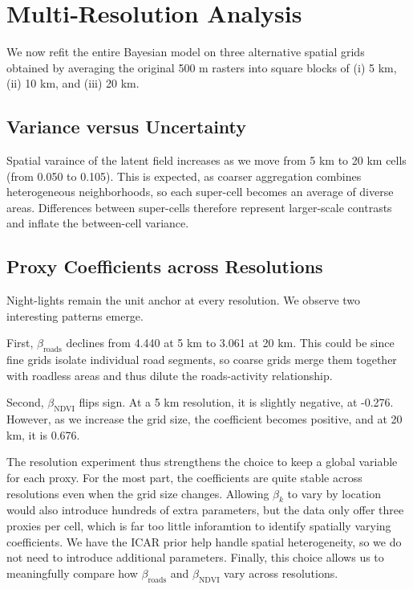 \documentclass[12pt]{article}
\begin{document}
\section{Multi‑Resolution Analysis}
\label{sec:multires}

We now refit the entire Bayesian model on three alternative spatial grids obtained by averaging the original 500 m rasters into square blocks of (i) 5 km, (ii) 10 km, and (iii) 20 km.

\subsection{Variance versus Uncertainty}

Spatial varaince of the latent field increases as we move from 5 km to 20 km cells (from 0.050 to 0.105). This is expected, as coarser aggregation combines heterogeneous neighborhoods, so each super-cell becomes an average of diverse areas. Differences between super-cells therefore represent larger-scale contrasts and inflate the between-cell variance.

\subsection{Proxy Coefficients across Resolutions}
Night-lights remain the unit anchor at every resolution. We observe two interesting patterns emerge. 

First, $\beta_{\text{roads}}$ declines from 4.440 at 5 km to 3.061 at 20 km. This could be since fine grids isolate individual road segments, so coarse grids merge them together with roadless areas and thus dilute the roads-activity relationship.

Second, $\beta_{\text{NDVI}}$ flips sign. At a 5 km resolution, it is slightly negative, at -0.276. However, as we increase the grid size, the coefficient becomes positive, and at 20 km, it is 0.676. 

The resolution experiment thus strengthens the choice to keep a global variable for each proxy. For the most part, the coefficients are quite stable across resolutions even when the grid size changes. Allowing $\beta_k$ to vary by location would also introduce hundreds of extra parameters, but the data only offer three proxies per cell, which is far too little inforamtion to identify spatially varying coefficients. We have the ICAR prior help handle spatial heterogeneity, so we do not need to introduce additional parameters. Finally, this choice allows us to meaningfully compare how $\beta_{\text{roads}}$ and $\beta_{\text{NDVI}}$ vary across resolutions.
\end{document}
